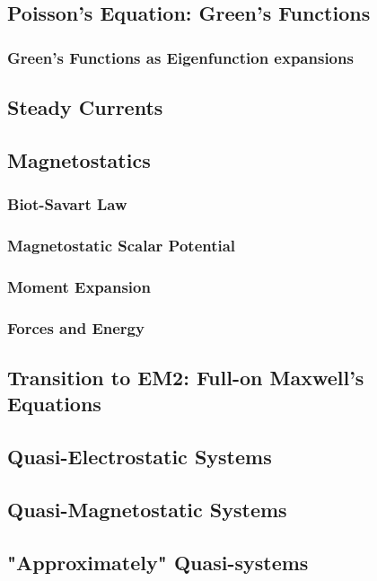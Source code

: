 \documentclass[]{article}
\begin{document}
\subsection{Poisson's Equation: Green's Functions}
\subsubsection{Green's Functions as Eigenfunction expansions}

\subsection{Steady Currents}

\subsection{Magnetostatics}
\subsubsection{Biot-Savart Law}
\subsubsection{Magnetostatic Scalar Potential}
\subsubsection{Moment Expansion}
\subsubsection{Forces and Energy}

\subsection{Transition to EM2: Full-on Maxwell's Equations}

\subsection{Quasi-Electrostatic Systems}

\subsection{Quasi-Magnetostatic Systems}

\subsection{"Approximately" Quasi-systems}
\end{document}
